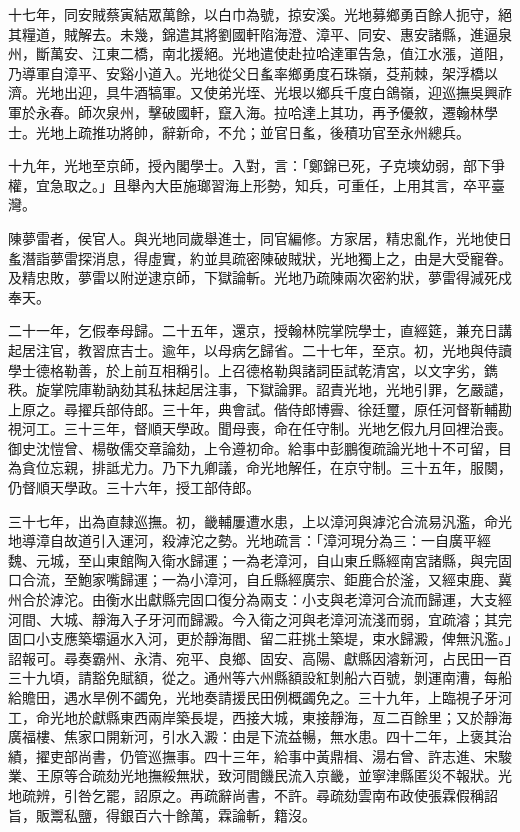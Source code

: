 \begin{pinyinscope}
十七年，同安賊蔡寅結眾萬餘，以白巾為號，掠安溪。光地募鄉勇百餘人扼守，絕其糧道，賊解去。未幾，錦遣其將劉國軒陷海澄、漳平、同安、惠安諸縣，進逼泉州，斷萬安、江東二橋，南北援絕。光地遣使赴拉哈達軍告急，值江水漲，道阻，乃導軍自漳平、安谿小道入。光地從父日蚃率鄉勇度石珠嶺，芟荊棘，架浮橋以濟。光地出迎，具牛酒犒軍。又使弟光垤、光垠以鄉兵千度白鴿嶺，迎巡撫吳興祚軍於永春。師次泉州，擊破國軒，竄入海。拉哈達上其功，再予優敘，遷翰林學士。光地上疏推功將帥，辭新命，不允；並官日蚃，後積功官至永州總兵。

十九年，光地至京師，授內閣學士。入對，言：「鄭錦已死，子克塽幼弱，部下爭權，宜急取之。」且舉內大臣施瑯習海上形勢，知兵，可重任，上用其言，卒平臺灣。

陳夢雷者，侯官人。與光地同歲舉進士，同官編修。方家居，精忠亂作，光地使日蚃潛詣夢雷探消息，得虛實，約並具疏密陳破賊狀，光地獨上之，由是大受寵眷。及精忠敗，夢雷以附逆逮京師，下獄論斬。光地乃疏陳兩次密約狀，夢雷得減死戍奉天。

二十一年，乞假奉母歸。二十五年，還京，授翰林院掌院學士，直經筵，兼充日講起居注官，教習庶吉士。逾年，以母病乞歸省。二十七年，至京。初，光地與侍讀學士德格勒善，於上前互相稱引。上召德格勒與諸詞臣試乾清宮，以文字劣，鐫秩。旋掌院庫勒訥劾其私抹起居注事，下獄論罪。詔責光地，光地引罪，乞嚴譴，上原之。尋擢兵部侍郎。三十年，典會試。偕侍郎博霽、徐廷璽，原任河督靳輔勘視河工。三十三年，督順天學政。聞母喪，命在任守制。光地乞假九月回裡治喪。御史沈愷曾、楊敬儒交章論劾，上令遵初命。給事中彭鵬復疏論光地十不可留，目為貪位忘親，排詆尤力。乃下九卿議，命光地解任，在京守制。三十五年，服闋，仍督順天學政。三十六年，授工部侍郎。

三十七年，出為直隸巡撫。初，畿輔屢遭水患，上以漳河與滹沱合流易汎濫，命光地導漳自故道引入運河，殺滹沱之勢。光地疏言：「漳河現分為三：一自廣平經魏、元城，至山東館陶入衛水歸運；一為老漳河，自山東丘縣經南宮諸縣，與完固口合流，至鮑家嘴歸運；一為小漳河，自丘縣經廣宗、鉅鹿合於滏，又經束鹿、冀州合於滹沱。由衡水出獻縣完固口復分為兩支：小支與老漳河合流而歸運，大支經河間、大城、靜海入子牙河而歸澱。今入衛之河與老漳河流淺而弱，宜疏濬；其完固口小支應築壩逼水入河，更於靜海閻、留二莊挑土築堤，束水歸澱，俾無汎濫。」詔報可。尋奏霸州、永清、宛平、良鄉、固安、高陽、獻縣因濬新河，占民田一百三十九頃，請豁免賦額，從之。通州等六州縣額設紅剝船六百號，剝運南漕，每船給贍田，遇水旱例不蠲免，光地奏請援民田例概蠲免之。三十九年，上臨視子牙河工，命光地於獻縣東西兩岸築長堤，西接大城，東接靜海，亙二百餘里；又於靜海廣福樓、焦家口開新河，引水入澱：由是下流益暢，無水患。四十二年，上褒其治績，擢吏部尚書，仍管巡撫事。四十三年，給事中黃鼎楫、湯右曾、許志進、宋駿業、王原等合疏劾光地撫綏無狀，致河間饑民流入京畿，並寧津縣匿災不報狀。光地疏辨，引咎乞罷，詔原之。再疏辭尚書，不許。尋疏劾雲南布政使張霖假稱詔旨，販鬻私鹽，得銀百六十餘萬，霖論斬，籍沒。


\end{pinyinscope}
